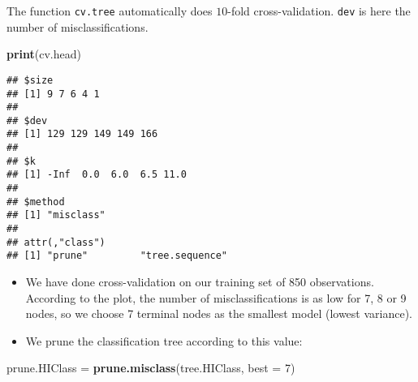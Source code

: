 \documentclass[10pt,ignorenonframetext,]{beamer}
\newenvironment{Shaded}{\begin{snugshade}}{\end{snugshade}}
\newcommand{\DataTypeTok}[1]{\textcolor[rgb]{0.13,0.29,0.53}{#1}}
\newcommand{\DecValTok}[1]{\textcolor[rgb]{0.00,0.00,0.81}{#1}}
\newcommand{\KeywordTok}[1]{\textcolor[rgb]{0.13,0.29,0.53}{\textbf{#1}}}
\newcommand{\NormalTok}[1]{#1}
\newcommand{\StringTok}[1]{\textcolor[rgb]{0.31,0.60,0.02}{#1}}
\begin{document}
\begin{frame}[fragile]

The function \texttt{cv.tree} automatically does \(10\)-fold
cross-validation. \texttt{dev} is here the number of misclassifications.

\vspace{3mm}

\scriptsize

\begin{Shaded}
\begin{Highlighting}[]
\KeywordTok{print}\NormalTok{(cv.head)}
\end{Highlighting}
\end{Shaded}

\begin{verbatim}
## $size
## [1] 9 7 6 4 1
## 
## $dev
## [1] 129 129 149 149 166
## 
## $k
## [1] -Inf  0.0  6.0  6.5 11.0
## 
## $method
## [1] "misclass"
## 
## attr(,"class")
## [1] "prune"         "tree.sequence"
\end{verbatim}

\end{frame}

\begin{frame}[fragile]

\begin{itemize}
\item
  We have done cross-validation on our training set of 850 observations.
  According to the plot, the number of misclassifications is as low for
  7, 8 or 9 nodes, so we choose 7 terminal nodes as the smallest model
  (lowest variance).
\item
  We prune the classification tree according to this value:
\end{itemize}

\vspace{4mm}

\scriptsize

\begin{Shaded}
\begin{Highlighting}[]
\NormalTok{prune.HIClass =}\StringTok{ }\KeywordTok{prune.misclass}\NormalTok{(tree.HIClass, }\DataTypeTok{best =} \DecValTok{7}\NormalTok{)}
\end{Highlighting}
\end{Shaded}

\end{frame}
\end{document}
